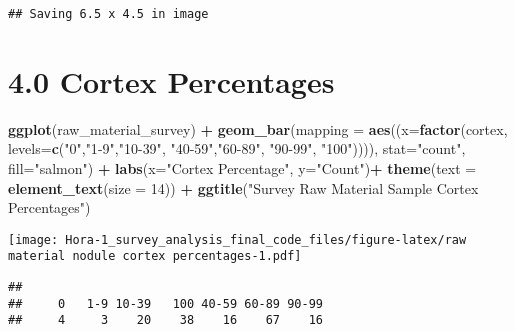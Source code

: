 \documentclass[
]{article}
\newenvironment{Shaded}{\begin{snugshade}}{\end{snugshade}}
\newcommand{\AttributeTok}[1]{\textcolor[rgb]{0.13,0.29,0.53}{#1}}
\newcommand{\DecValTok}[1]{\textcolor[rgb]{0.00,0.00,0.81}{#1}}
\newcommand{\FunctionTok}[1]{\textcolor[rgb]{0.13,0.29,0.53}{\textbf{#1}}}
\newcommand{\NormalTok}[1]{#1}
\newcommand{\OtherTok}[1]{\textcolor[rgb]{0.56,0.35,0.01}{#1}}
\newcommand{\SpecialCharTok}[1]{\textcolor[rgb]{0.81,0.36,0.00}{\textbf{#1}}}
\newcommand{\StringTok}[1]{\textcolor[rgb]{0.31,0.60,0.02}{#1}}
\begin{document}
\begin{verbatim}
## Saving 6.5 x 4.5 in image
\end{verbatim}

\hypertarget{cortex-percentages}{%
\section{4.0 Cortex Percentages}\label{cortex-percentages}}

\begin{Shaded}
\begin{Highlighting}[]
\FunctionTok{ggplot}\NormalTok{(raw\_material\_survey) }\SpecialCharTok{+}
  \FunctionTok{geom\_bar}\NormalTok{(}\AttributeTok{mapping =} \FunctionTok{aes}\NormalTok{((}\AttributeTok{x=}\FunctionTok{factor}\NormalTok{(cortex, }\AttributeTok{levels=}\FunctionTok{c}\NormalTok{(}\StringTok{"0"}\NormalTok{,}\StringTok{"1{-}9"}\NormalTok{,}\StringTok{"10{-}39"}\NormalTok{, }\StringTok{"40{-}59"}\NormalTok{,}\StringTok{"60{-}89"}\NormalTok{, }\StringTok{"90{-}99"}\NormalTok{, }\StringTok{"100"}\NormalTok{)))), }\AttributeTok{stat=}\StringTok{"count"}\NormalTok{, }\AttributeTok{fill=}\StringTok{"salmon"}\NormalTok{) }\SpecialCharTok{+}
  \FunctionTok{labs}\NormalTok{(}\AttributeTok{x=}\StringTok{"Cortex Percentage"}\NormalTok{, }\AttributeTok{y=}\StringTok{"Count"}\NormalTok{)}\SpecialCharTok{+}
  \FunctionTok{theme}\NormalTok{(}\AttributeTok{text =} \FunctionTok{element\_text}\NormalTok{(}\AttributeTok{size =} \DecValTok{14}\NormalTok{)) }\SpecialCharTok{+}
  \FunctionTok{ggtitle}\NormalTok{(}\StringTok{"Survey Raw Material Sample Cortex Percentages"}\NormalTok{)}
\end{Highlighting}
\end{Shaded}

\texttt{[image: Hora-1\_survey\_analysis\_final\_code\_files/figure-latex/raw material nodule cortex percentages-1.pdf]}

\begin{Shaded}
\end{Shaded}

\begin{verbatim}
## 
##     0   1-9 10-39   100 40-59 60-89 90-99 
##     4     3    20    38    16    67    16
\end{verbatim}

\begin{Shaded}
\end{Shaded}
\end{document}

